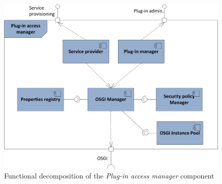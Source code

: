\begin{figure}[h!]
  \centering
  	\includegraphics[scale=0.85]{plug-in/layers/access-func.png}
  \caption{Functional decomposition of the \textit{Plug-in access manager} component}
  \label{fig_access_func}
\end{figure}

